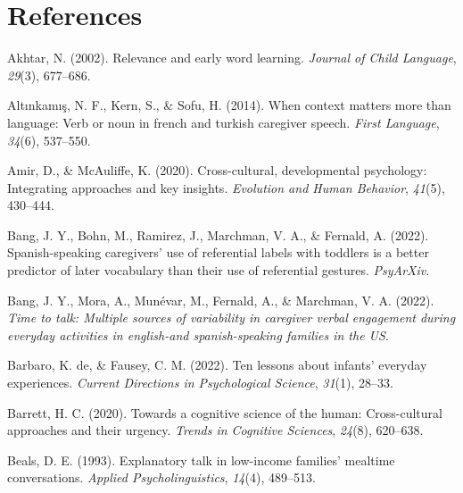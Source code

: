 \documentclass[
  man,floatsintext]{apa6}
\newlength{\cslhangindent}
\newlength{\cslentryspacingunit} %
\newenvironment{CSLReferences}[2] %
 {%
  \setlength{\parindent}{0pt}
  \ifodd #1
  \let\oldpar\par
  \def\par{\hangindent=\cslhangindent\oldpar}
  \fi
  \setlength{\parskip}{#2\cslentryspacingunit}
 }%
 {}
\begin{document}
\newpage

\hypertarget{references}{%
\section{References}\label{references}}

\hypertarget{refs}{}
\begin{CSLReferences}{1}{0}
\leavevmode{}%
Akhtar, N. (2002). Relevance and early word learning. \emph{Journal of Child Language}, \emph{29}(3), 677--686.

\leavevmode{}%
Altınkamış, N. F., Kern, S., \& Sofu, H. (2014). When context matters more than language: Verb or noun in french and turkish caregiver speech. \emph{First Language}, \emph{34}(6), 537--550.

\leavevmode{}%
Amir, D., \& McAuliffe, K. (2020). Cross-cultural, developmental psychology: Integrating approaches and key insights. \emph{Evolution and Human Behavior}, \emph{41}(5), 430--444.

\leavevmode{}%
Bang, J. Y., Bohn, M., Ramirez, J., Marchman, V. A., \& Fernald, A. (2022). Spanish-speaking caregivers' use of referential labels with toddlers is a better predictor of later vocabulary than their use of referential gestures. \emph{PsyArXiv}.

\leavevmode{}%
Bang, J. Y., Mora, A., Munévar, M., Fernald, A., \& Marchman, V. A. (2022). \emph{Time to talk: Multiple sources of variability in caregiver verbal engagement during everyday activities in english-and spanish-speaking families in the US}.

\leavevmode{}%
Barbaro, K. de, \& Fausey, C. M. (2022). Ten lessons about infants' everyday experiences. \emph{Current Directions in Psychological Science}, \emph{31}(1), 28--33.

\leavevmode{}%
Barrett, H. C. (2020). Towards a cognitive science of the human: Cross-cultural approaches and their urgency. \emph{Trends in Cognitive Sciences}, \emph{24}(8), 620--638.

\leavevmode{}%
Beals, D. E. (1993). Explanatory talk in low-income families' mealtime conversations. \emph{Applied Psycholinguistics}, \emph{14}(4), 489--513.


\end{CSLReferences}
\end{document}
